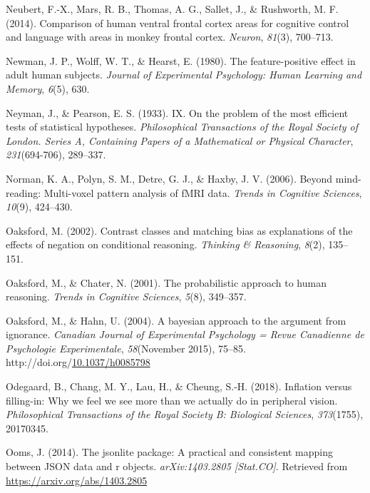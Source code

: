 \documentclass[12pt,twoside]{reedthesis}
\newenvironment{CSLReferences}%
  {}%
  {\par}
\begin{document}
\begin{CSLReferences}{1}{0}
\leavevmode\hypertarget{ref-neubert2014comparison}{}%
Neubert, F.-X., Mars, R. B., Thomas, A. G., Sallet, J., \& Rushworth, M. F. (2014). Comparison of human ventral frontal cortex areas for cognitive control and language with areas in monkey frontal cortex. \emph{Neuron}, \emph{81}(3), 700--713.

\leavevmode\hypertarget{ref-newman1980feature}{}%
Newman, J. P., Wolff, W. T., \& Hearst, E. (1980). The feature-positive effect in adult human subjects. \emph{Journal of Experimental Psychology: Human Learning and Memory}, \emph{6}(5), 630.

\leavevmode\hypertarget{ref-neyman1933ix}{}%
Neyman, J., \& Pearson, E. S. (1933). IX. On the problem of the most efficient tests of statistical hypotheses. \emph{Philosophical Transactions of the Royal Society of London. Series A, Containing Papers of a Mathematical or Physical Character}, \emph{231}(694-706), 289--337.

\leavevmode\hypertarget{ref-norman2006beyond}{}%
Norman, K. A., Polyn, S. M., Detre, G. J., \& Haxby, J. V. (2006). Beyond mind-reading: Multi-voxel pattern analysis of fMRI data. \emph{Trends in Cognitive Sciences}, \emph{10}(9), 424--430.

\leavevmode\hypertarget{ref-oaksford2002contrast}{}%
Oaksford, M. (2002). Contrast classes and matching bias as explanations of the effects of negation on conditional reasoning. \emph{Thinking \& Reasoning}, \emph{8}(2), 135--151.

\leavevmode\hypertarget{ref-oaksford2001probabilistic}{}%
Oaksford, M., \& Chater, N. (2001). The probabilistic approach to human reasoning. \emph{Trends in Cognitive Sciences}, \emph{5}(8), 349--357.

\leavevmode\hypertarget{ref-Oaksford2004}{}%
Oaksford, M., \& Hahn, U. (2004). A bayesian approach to the argument from ignorance. \emph{Canadian Journal of Experimental Psychology = Revue Canadienne de Psychologie Experimentale}, \emph{58}(November 2015), 75--85. http://doi.org/\href{https://doi.org/10.1037/h0085798}{10.1037/h0085798}

\leavevmode\hypertarget{ref-odegaard2018inflation}{}%
Odegaard, B., Chang, M. Y., Lau, H., \& Cheung, S.-H. (2018). Inflation versus filling-in: Why we feel we see more than we actually do in peripheral vision. \emph{Philosophical Transactions of the Royal Society B: Biological Sciences}, \emph{373}(1755), 20170345.

\leavevmode\hypertarget{ref-R-jsonlite}{}%
Ooms, J. (2014). The jsonlite package: A practical and consistent mapping between JSON data and r objects. \emph{arXiv:1403.2805 {[}Stat.CO{]}}. Retrieved from \url{https://arxiv.org/abs/1403.2805}


\end{CSLReferences}
\end{document}
